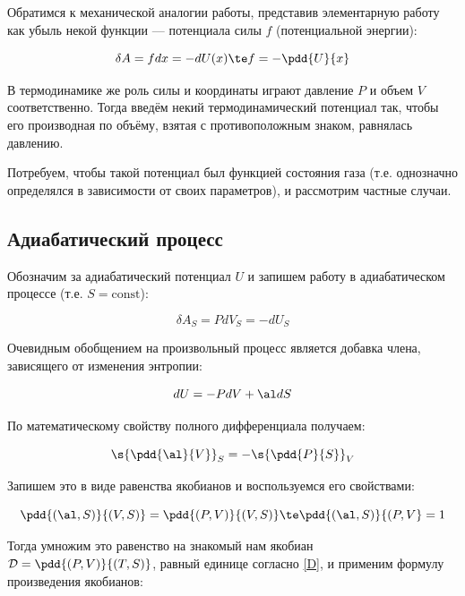 \documentclass[12pt]{kiarticle}
\newcommand{\del}{\ensuremath{\delta}}
\newcommand{\co}{\ensuremath{\mathrm{const}}}
\newcommand{\D}{\ensuremath{\mathcal{D}}}
\begin{document}
Обратимся к механической аналогии работы, представив элементарную работу как убыль некой функции --- потенциала силы $ f $ (потенциальной энергии):

\begin{equation}\label{}
\del A = fdx = -dU(x) \te f = -\pdd{U}{x}
\end{equation}

В термодинамике же роль силы и координаты играют давление $ P $ и объем $ V $ соответственно. Тогда введём некий термодинамический потенциал так, чтобы его производная по объёму, взятая с противоположным знаком, равнялась давлению. 

Потребуем, чтобы такой потенциал был функцией состояния газа (т.е. однозначно определялся в зависимости от своих параметров), и рассмотрим частные случаи.

\subsection{Адиабатический процесс}

Обозначим за адиабатический потенциал $ U $ и запишем работу в адиабатическом процессе (т.е. $ S = \co $):

\begin{equation}\label{U_S}
\del A_S = P dV_S = - dU_S
\end{equation}

Очевидным обобщением на произвольный процесс является добавка члена, зависящего от изменения энтропии:

\begin{equation}\label{U}
dU = - PdV + \al dS
\end{equation}

По математическому свойству полного дифференциала получаем:

\begin{equation}\label{}
\s{\pdd{\al}{V}}_S = - \s{\pdd{P}{S}}_V
\end{equation}

Запишем это в виде равенства якобианов и воспользуемся его свойствами:

\begin{equation}\label{}
\pdd{(\al, S)}{(V, S)} = \pdd{(P, V)}{(V, S)} \te \pdd{(\al, S)}{(P, V} = 1
\end{equation}

Тогда умножим это равенство на знакомый нам якобиан $ \D  = \pdd{(P, V)}{(T, S)} $, равный единице согласно \eqref{D}, и применим формулу произведения якобианов:
\end{document}
